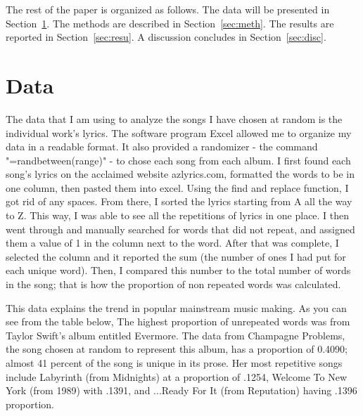 \documentclass[12pt]{article}
\begin{document}
The rest of the paper is organized as follows.
The data will be presented in Section~\ref{sec:data}.
The methods are described in Section~\ref{sec:meth}.
The results are reported in Section~\ref{sec:resu}.
A discussion concludes in Section~\ref{sec:disc}.


\section{Data}
\label{sec:data}

The data that I am using to analyze the songs I have chosen at random is the individual work's lyrics. The software program Excel allowed me to organize my data in a readable format. It also provided a randomizer - the command "=randbetween(range)" - to chose each song from each album. I first found each song's lyrics on the acclaimed website azlyrics.com, formatted the words to be in one column, then pasted them into excel. Using the find and replace function, I got rid of any spaces. From there, I sorted the lyrics starting from A all the way to Z. This way, I was able to see all the repetitions of lyrics in one place. I then went through and manually searched for words that did not repeat, and assigned them a value of 1 in the column next to the word. After that was complete, I selected the column and it reported the sum (the number of ones I had put for each unique word). Then, I compared this number to the total number of words in the song; that is how the proportion of non repeated words was calculated.

This data explains the trend in popular mainstream music making. As you can see from the table below, The highest proportion of unrepeated words was from Taylor Swift's album entitled Evermore. The data from Champagne Problems, the song chosen at random to represent this album, has a proportion of 0.4090; almost 41 percent of the song is unique in its prose. Her most repetitive songs include Labyrinth (from Midnights) at a proportion of .1254, Welcome To New York (from 1989) with .1391, and ...Ready For It (from Reputation) having .1396 proportion. 
\end{document}
